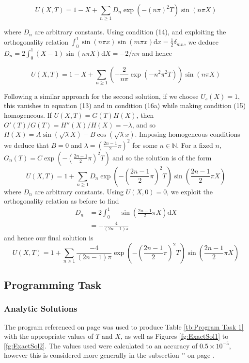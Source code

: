\documentclass[10pt,a4paper,notitlepage]{article}
\newcommand{\N}{\mathbb{N}}
\begin{document}
\begin{equation}
U(X,T)=1-X+\sum_{n\geq 1}D_{n}\exp(-(n\pi)^{2}T)\sin(n\pi X)
\end{equation}

where $D_{n}$ are arbitrary constants.  Using condition (14), and exploiting the orthogonality relation $\int_{0}^{1}\sin(n\pi x)\sin(m\pi x)\mathrm{d}x=\frac{1}{2}\delta_{mn}$, we deduce $D_{n}=2\int_{0}^{1}\left(X-1\right)\sin(n\pi X)\mathrm{d}X= -2/n\pi$ and hence

\begin{equation}\label{eq:Sol 1}
U(X,T)=1-X+\sum_{n\geq 1}\left(-\frac{2}{n\pi}\exp\left( -n^{2}\pi^{2}T\right)\right)\sin\left(n\pi X\right)
\end{equation}

Following a similar approach for the second solution, if we choose $U_{s}(X)=1$, this vanishes in equation (13) and in condition (16a) while making condition (15) homogeneous. If $U(X,T)=G(T)H(X)$, then $G'(T)/G(T)=H''(X)/H(X)=-\lambda$, and so $H(X)=A\sin(\sqrt{\lambda}X)+B\cos(\sqrt{\lambda}x)$. Imposing homogeneous conditions we deduce that $B=0$ and $\lambda=\left( \frac{2n-1}{2} \pi\right)^{2}$ for some $n\in \N$. For a fixed $n$, $G_{n}(T)=C\exp(-(\frac{2n-1}{2}\pi)^{2}T)$ and so the solution is of the form
\begin{equation}
U(X,T)=1+\sum_{n\geq 1}D_{n}\exp\left(-\left(\frac{2n-1}{2}\pi\right)^{2}T\right)\sin\left(\frac{2n-1}{2}\pi X\right)
\end{equation}
where $D_{n}$ are arbitrary constants. Using $U(X,0)=0$, we  exploit the orthogonality relation as before to find
\begin{equation}
\begin{aligned}
D_{n}&=2\int_{0}^{1}-\sin\left(\frac{2n-1}{2}\pi X\right)\mathrm{d}X\\
&= -\frac{4}{\left(2n-1\right)\pi}
\end{aligned}
\end{equation}
and hence our final solution is
\begin{equation}\label{eq:Sol 2}
U(X,T)=1+\sum_{n\geq 1}\frac{-4}{\left(2n-1\right)\pi}\exp\left(-\left(\frac{2n-1}{2}\pi\right)^{2}T\right)\sin\left(\frac{2n-1}{2}\pi X\right)
\end{equation}
\subsection*{\centering Programming Task}
\subsubsection*{\centering Analytic Solutions}\label{subsec:Analytic Solutions}
The program  referenced on page \pageref{cd:2.1} was used to produce Table \ref{tb:Program Task 1} with the appropriate values of $T$ and $X$, as well as Figures \ref{fg:ExactSol1} to \ref{fg:ExactSol2}. The values used were calculated to an accuracy of $0.5\times 10^{-5}$, however this is considered more generally in the subsection '' on page \pageref{subsec:Truncated Error}. 
\end{document}
